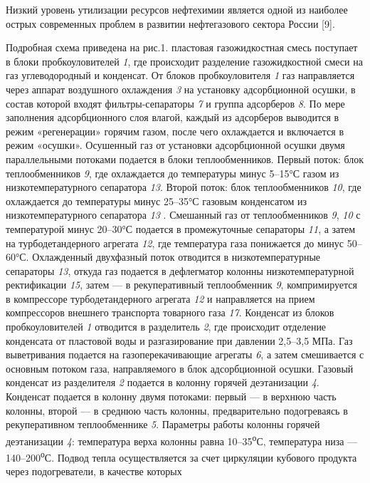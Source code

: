 Низкий уровень утилизации ресурсов нефтехимии является одной из наиболее
острых современных проблем в развитии нефтегазового сектора России
{[}9{]}.

Подробная схема приведена на рис.1. пластовая газожидкостная смесь
поступает в блоки пробкоуловителей \emph{1}, где происходит разделение
газожидкостной смеси на газ углеводородный и конденсат. От блоков
пробкоуловителя \emph{1} газ направляется через аппарат воздушного
охлаждения \emph{3} на установку адсорбционной осушки, в состав которой
входят фильтры-сепараторы \emph{7} и группа адсорберов \emph{8}. По мере
заполнения адсорбционного слоя влагой, каждый из адсорберов выводится в
режим «регенерации» горячим газом, после чего охлаждается и включается в
режим «осушки». Осушенный газ от установки адсорбционной осушки двумя
параллельными потоками подается в блоки теплообменников. Первый поток:
блок теплообменников \emph{9}, где охлаждается до температуры минус
5--15°С газом из низкотемпературного сепаратора \emph{13}. Второй поток:
блок теплообменников \emph{10}, где охлаждается до температуры минус
25--35°С газовым конденсатом из низкотемпературного сепаратора \emph{13}
. Смешанный газ от теплообменников \emph{9}, \emph{10} с температурой
минус 20--30°С подается в промежуточные сепараторы \emph{11}, а затем на
турбодетандерного агрегата \emph{12}, где температура газа понижается до
минус 50--60°С. Охлажденный двухфазный поток отводится в
низкотемпературные сепараторы \emph{13}, откуда газ подается в
дефлегматор колонны низкотемпературной ректификации \emph{15}, затем ---
в рекуперативный теплообменник \emph{9}, компримируется в компрессоре
турбодетандерного агрегата \emph{12} и направляется на прием
компрессоров внешнего транспорта товарного газа \emph{17}. Конденсат из
блоков пробкоуловителей \emph{1} отводится в разделитель \emph{2}, где
происходит отделение конденсата от пластовой воды и разгазирование при
давлении 2,5--3,5 МПа. Газ выветривания подается на газоперекачивающие
агрегаты \emph{6}, а затем смешивается с основным потоком газа,
направляемого в блок адсорбционной осушки. Газовый конденсат из
разделителя \emph{2} подается в колонну горячей деэтанизации \emph{4}.
Конденсат подается в колонну двумя потоками: первый --- в верхнюю часть
колонны, второй --- в среднюю часть колонны, предварительно подогреваясь
в рекуперативном теплообменнике \emph{5}. Параметры работы колонны
горячей деэтанизации \emph{4}: температура верха колонны равна
10--35\textsuperscript{о}С, температура низа
---140--200\textsuperscript{о}С. Подвод тепла осуществляется за счет
циркуляции кубового продукта через подогреватели, в качестве которых
